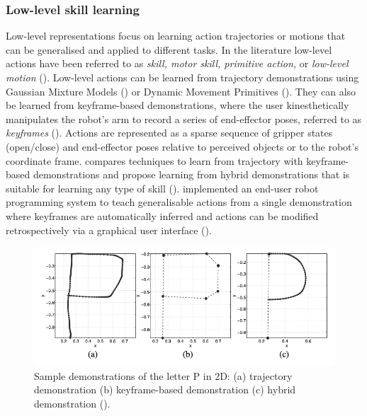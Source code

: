 \subsubsection{Low-level skill learning}\label{ssec:lowlevel}
Low-level representations focus on learning action trajectories or motions that can be generalised and applied to different tasks.
In the literature low-level actions have been referred to as \textit{skill, motor skill, primitive action,} or \textit{low-level motion} (\cite{chernova2014robot}).
Low-level actions can be learned from trajectory demonstrations using Gaussian Mixture Models (\cite{billard2008robot}) or Dynamic Movement Primitives (\cite{pastor2009learning}).
They can also be learned from keyframe-based demonstrations, %
where the user kinesthetically manipulates the robot's arm to record a series of end-effector poses, referred to as \textit{keyframes} (\cite{akgun2012keyframe}). 
Actions are represented as a sparse sequence of gripper states (open/close) and end-effector poses relative to perceived objects or to the robot's coordinate frame.
\cite{akgun2012keyframe} compares techniques to learn from trajectory with keyframe-based demonstrations and propose learning from hybrid demonstrations that is suitable for learning any type of skill ().
\cite{alexandrova2014robot} implemented an end-user robot programming system to teach generalisable actions from a single demonstration where keyframes are automatically inferred and actions can be modified retrospectively via a graphical user interface ().

\begin{figure}[!h]
	\centering
	\includegraphics[width=0.7\linewidth]{figures/kLfd}
	\caption{Sample demonstrations of the letter P in 2D: (a) trajectory demonstration (b) keyframe-based demonstration (c) hybrid demonstration (\cite{akgun2012keyframe}).}
	\label{fig:lowlevel}
\end{figure} 

